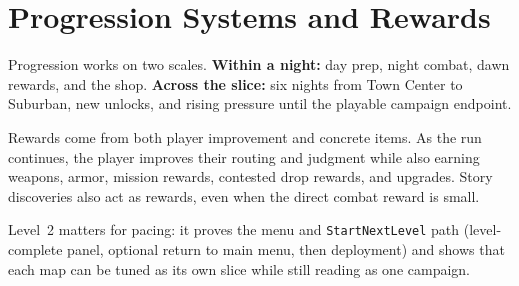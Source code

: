 \documentclass[11pt]{article}
\begin{document}
\section{Progression Systems and Rewards}\label{sec:progression}

Progression works on two scales. \textbf{Within a night:} day prep, night combat, dawn rewards, and the shop. \textbf{Across the slice:} six nights from Town Center to Suburban, new unlocks, and rising pressure until the playable campaign endpoint.

Rewards come from both player improvement and concrete items. As the run continues, the player improves their routing and judgment while also earning weapons, armor, mission rewards, contested drop rewards, and upgrades. Story discoveries also act as rewards, even when the direct combat reward is small.

Level~2 matters for pacing: it proves the menu and \texttt{StartNextLevel} path (level-complete panel, optional return to main menu, then deployment) and shows that each map can be tuned as its own slice while still reading as one campaign.
\end{document}
